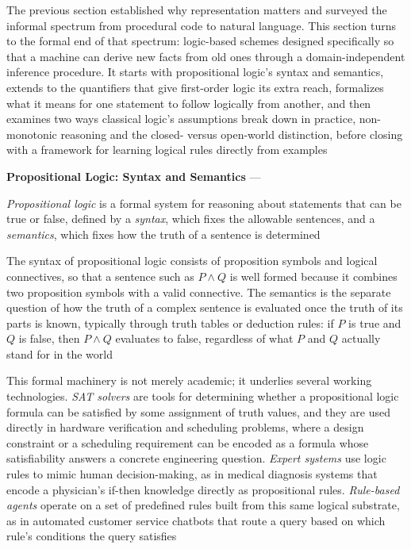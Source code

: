The previous section established why representation matters and surveyed
the informal spectrum from procedural code to natural language. This
section turns to the formal end of that spectrum: logic-based schemes
designed specifically so that a machine can derive new facts from old ones
through a domain-independent inference procedure. It starts with
propositional logic's syntax and semantics, extends to the quantifiers that
give first-order logic its extra reach, formalizes what it means for one
statement to follow logically from another, and then examines two ways
classical logic's assumptions break down in practice, non-monotonic
reasoning and the closed- versus open-world distinction, before closing
with a framework for learning logical rules directly from examples

\textbf{Propositional Logic: Syntax and Semantics} --- \begin{definition}
  \emph{Propositional logic} is a formal system for reasoning about
  statements that can be true or false, defined by a \emph{syntax}, which
  fixes the allowable sentences, and a \emph{semantics}, which fixes how
  the truth of a sentence is determined
\end{definition}
The syntax of propositional logic consists of proposition symbols and
logical connectives, so that a sentence such as $P \land Q$ is well formed
because it combines two proposition symbols with a valid connective. The
semantics is the separate question of how the truth of a complex sentence
is evaluated once the truth of its parts is known, typically through truth
tables or deduction rules: if $P$ is true and $Q$ is false, then $P \land
Q$ evaluates to false, regardless of what $P$ and $Q$ actually stand for in
the world

This formal machinery is not merely academic; it underlies several working
technologies. \emph{SAT solvers} are tools for determining whether a
propositional logic formula can be satisfied by some assignment of truth
values, and they are used directly in hardware verification and scheduling
problems, where a design constraint or a scheduling requirement can be
encoded as a formula whose satisfiability answers a concrete engineering
question. \emph{Expert systems} use logic rules to mimic human
decision-making, as in medical diagnosis systems that encode a physician's
if-then knowledge directly as propositional rules. \emph{Rule-based agents}
operate on a set of predefined rules built from this same logical
substrate, as in automated customer service chatbots that route a query
based on which rule's conditions the query satisfies

